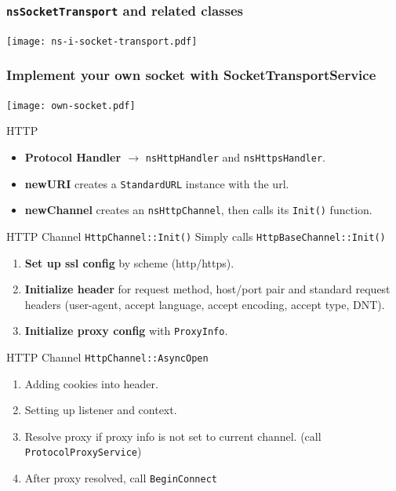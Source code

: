 \documentclass{beamer}
\begin{document}
\begin{frame}[fragile]
  \frametitle{\texttt{nsSocketTransport} and related classes}
  \begin{center}
    \texttt{[image: ns-i-socket-transport.pdf]}
  \end{center}
\end{frame}

\begin{frame}[fragile]
  \frametitle{Implement your own socket with SocketTransportService}
  \begin{center}
    \texttt{[image: own-socket.pdf]}
  \end{center}
\end{frame}


\begin{frame}{HTTP}
  \begin{itemize}
  \item \textbf{Protocol Handler $\rightarrow$} \texttt{nsHttpHandler} and \texttt{nsHttpsHandler}.
  \item \textbf{newURI} creates a \texttt{StandardURL} instance with the url.
  \item \textbf{newChannel} creates an \texttt{nsHttpChannel}, then calls its \texttt{Init()} function.
  \end{itemize}
\end{frame}

\begin{frame}{HTTP Channel}
  \texttt{HttpChannel::Init()}  Simply calls \texttt{HttpBaseChannel::Init()}
  \begin{enumerate}
  \item \textbf{Set up ssl config} by scheme (http/https).
  \item \textbf{Initialize header} for request method, host/port pair and standard request headers (user-agent, accept language, accept encoding, accept type, DNT).
  \item \textbf{Initialize proxy config} with \texttt{ProxyInfo}.
  \end{enumerate}
\end{frame}

\begin{frame}{HTTP Channel}
  \texttt{HttpChannel::AsyncOpen}
  \begin{enumerate}
  \item Adding cookies into header.
  \item Setting up listener and context.
  \item Resolve proxy if proxy info is not set to current channel. (call \texttt{ProtocolProxyService})
  \item After proxy resolved, call \texttt{BeginConnect}
  \end{enumerate}
\end{frame}
\end{document}
